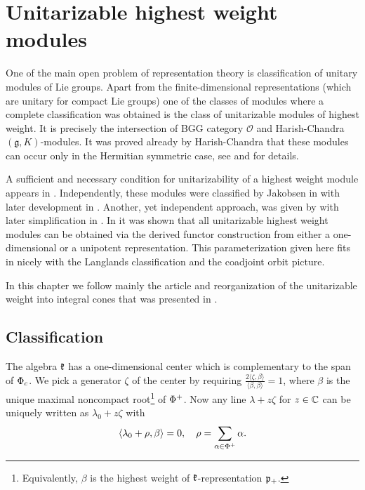 \chapter{Unitarizable highest weight modules}\label{ch:unitarizable}

One of the main open problem of representation theory is classification of unitary modules of Lie groups. Apart from the finite-dimensional representations (which are unitary for compact Lie groups) one of the classes of modules where a complete classification was obtained is the class of unitarizable modules of highest weight. It is precisely the intersection of BGG category $\mathcal{O}$ and Harish-Chandra $(\mathfrak{g}, K)$-modules. It was proved already by Harish-Chandra that these modules can occur only in the Hermitian symmetric case, see \cite{harish-chandra_representations_1955, harish-chandra_representations_1956-1} and \cite{harish-chandra_representations_1956} for details.

A sufficient and necessary condition for unitarizability of a highest weight module appears in \cite{garland_unitarizable_1981}. Independently, these modules were classified by Jakobsen in \cite{jakobsen_last_1981, jakobsen_hermitian_1983} with later development in \cite{jakobsen_intrinsic_1996}. Another, yet independent approach, was given by \cite{enright_classification_1983} with later simplification in \cite{joseph_annihilators_1992}. In \cite{adams_unitary_1987} it was shown that all unitarizable highest weight modules can be obtained via the derived functor construction from either a one-dimensional or a unipotent representation. This  parameterization given here fits in nicely with the Langlands classification and the coadjoint orbit picture.  

In this chapter we follow mainly the article \cite{enright_classification_1983} and reorganization of the unitarizable weight into integral cones that was presented in \cite{davidson_differential_1991}. 

\section{Classification}

The algebra $\mathfrak{k}$ has a one-dimensional center which is complementary to the span of $\Phi_c$. We pick a generator $\zeta$ of the center by requiring $\frac{2 \langle \zeta,\beta \rangle}{\langle \beta, \beta \rangle} = 1$, where $\beta$ is the unique maximal noncompact root\footnote{Equivalently, $\beta$ is the highest weight of $\mathfrak{k}$-representation $\mathfrak{p}_+$.} of $\Phi^+$. Now any line $\lambda+z\zeta$ for $z\in\mathbb{C}$ can be uniquely written as $\lambda_0 + z\zeta$ with
\[
 \langle \lambda_0 + \rho,\beta \rangle = 0, \quad \rho =\sum_{\alpha\in\Phi^+} \alpha.
\]

